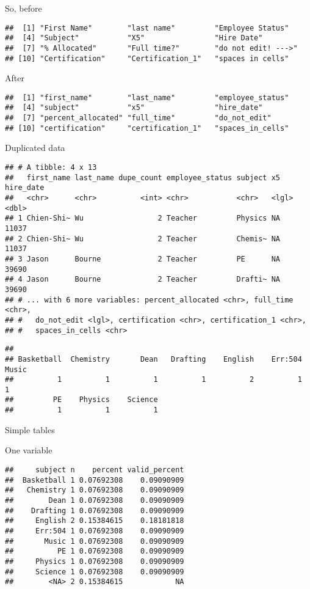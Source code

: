 \documentclass[
]{article}
\begin{document}
So, before

\begin{verbatim}
##  [1] "First Name"        "last name"         "Employee Status"  
##  [4] "Subject"           "X5"                "Hire Date"        
##  [7] "% Allocated"       "Full time?"        "do not edit! --->"
## [10] "Certification"     "Certification_1"   "spaces in cells"
\end{verbatim}

After

\begin{verbatim}
##  [1] "first_name"        "last_name"         "employee_status"  
##  [4] "subject"           "x5"                "hire_date"        
##  [7] "percent_allocated" "full_time"         "do_not_edit"      
## [10] "certification"     "certification_1"   "spaces_in_cells"
\end{verbatim}

Duplicated data

\begin{verbatim}
## # A tibble: 4 x 13
##   first_name last_name dupe_count employee_status subject x5    hire_date
##   <chr>      <chr>          <int> <chr>           <chr>   <lgl>     <dbl>
## 1 Chien-Shi~ Wu                 2 Teacher         Physics NA        11037
## 2 Chien-Shi~ Wu                 2 Teacher         Chemis~ NA        11037
## 3 Jason      Bourne             2 Teacher         PE      NA        39690
## 4 Jason      Bourne             2 Teacher         Drafti~ NA        39690
## # ... with 6 more variables: percent_allocated <chr>, full_time <chr>,
## #   do_not_edit <lgl>, certification <chr>, certification_1 <chr>,
## #   spaces_in_cells <chr>
\end{verbatim}

\begin{verbatim}
## 
## Basketball  Chemistry       Dean   Drafting    English    Err:504      Music 
##          1          1          1          1          2          1          1 
##         PE    Physics    Science 
##          1          1          1
\end{verbatim}

Simple tables

One variable

\begin{verbatim}
##     subject n    percent valid_percent
##  Basketball 1 0.07692308    0.09090909
##   Chemistry 1 0.07692308    0.09090909
##        Dean 1 0.07692308    0.09090909
##    Drafting 1 0.07692308    0.09090909
##     English 2 0.15384615    0.18181818
##     Err:504 1 0.07692308    0.09090909
##       Music 1 0.07692308    0.09090909
##          PE 1 0.07692308    0.09090909
##     Physics 1 0.07692308    0.09090909
##     Science 1 0.07692308    0.09090909
##        <NA> 2 0.15384615            NA
\end{verbatim}
\end{document}

